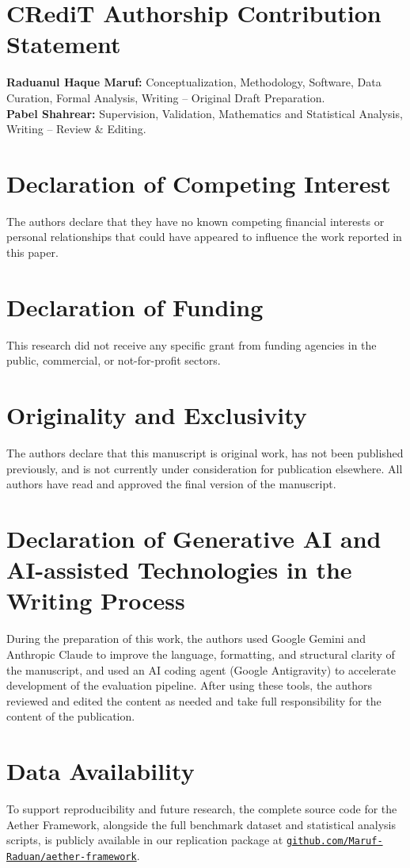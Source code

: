 \documentclass[review,12pt,3p]{elsarticle}
\begin{document}
\section*{CRediT Authorship Contribution Statement}
\textbf{Raduanul Haque Maruf:} Conceptualization, Methodology, Software, Data Curation, Formal Analysis, Writing -- Original Draft Preparation. \\
\textbf{Pabel Shahrear:} Supervision, Validation, Mathematics and Statistical Analysis, Writing -- Review \& Editing.

\section*{Declaration of Competing Interest}
The authors declare that they have no known competing financial interests or personal relationships that could have appeared to influence the work reported in this paper.

\section*{Declaration of Funding}
This research did not receive any specific grant from funding agencies in the public, commercial, or not-for-profit sectors.

\section*{Originality and Exclusivity}
The authors declare that this manuscript is original work, has not been published previously, and is not currently under consideration for publication elsewhere. All authors have read and approved the final version of the manuscript.

\section*{Declaration of Generative AI and AI-assisted Technologies in the Writing Process}
During the preparation of this work, the authors used Google Gemini and Anthropic Claude to improve the language, formatting, and structural clarity of the manuscript, and used an AI coding agent (Google Antigravity) to accelerate development of the evaluation pipeline. After using these tools, the authors reviewed and edited the content as needed and take full responsibility for the content of the publication.


\section*{Data Availability}

To support reproducibility and future research, the complete source code for the Aether
Framework, alongside the full benchmark dataset and statistical analysis scripts, is
publicly available in our replication package at
\href{https://github.com/Maruf-Raduan/aether-framework}{\texttt{github.com/Maruf-Raduan/aether-framework}}.



\end{document}
